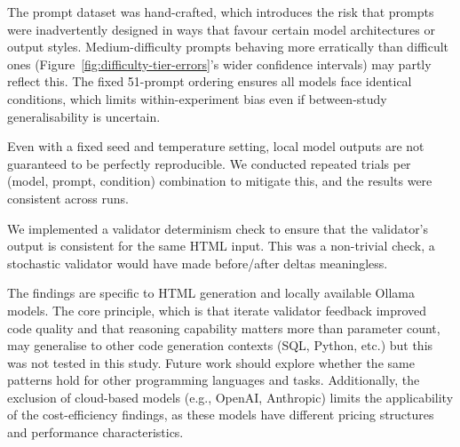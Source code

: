 The prompt dataset was hand-crafted, which introduces the risk that prompts were inadvertently designed in ways that favour certain model architectures or output styles. Medium-difficulty prompts behaving more erratically than difficult ones (Figure~\ref{fig:difficulty-tier-errors}'s wider confidence intervals) may partly reflect this. The fixed 51-prompt ordering ensures all models face identical conditions, which limits within-experiment bias even if between-study generalisability is uncertain.


Even with a fixed seed and temperature setting, local model outputs are not guaranteed to be perfectly reproducible. We conducted repeated trials per (model, prompt, condition) combination to mitigate this, and the results were consistent across runs.


We implemented a validator determinism check to ensure that the validator's output is consistent for the same HTML input. This was a non-trivial check, a stochastic validator would have made before/after deltas meaningless.


The findings are specific to HTML generation and locally available Ollama models. The core principle, which is that iterate validator feedback improved code quality and that reasoning capability matters more than parameter count, may generalise to other code generation contexts (SQL, Python, etc.) but this was not tested in this study. Future work should explore whether the same patterns hold for other programming languages and tasks. Additionally, the exclusion of cloud-based models (e.g., OpenAI, Anthropic) limits the applicability of the cost-efficiency findings, as these models have different pricing structures and performance characteristics.





